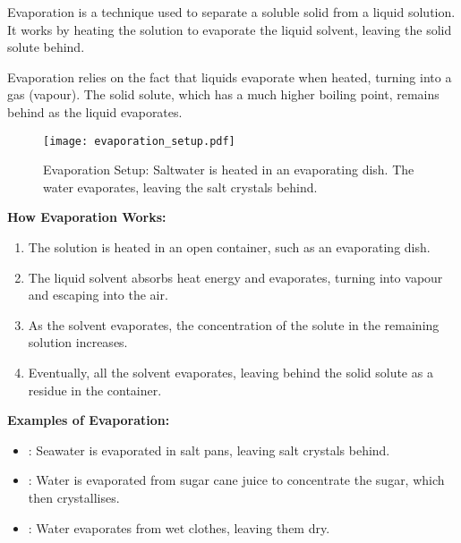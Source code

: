 \begin{keyconcept}{Evaporation}
 is a technique used to separate a soluble solid from a liquid solution. It works by heating the solution to evaporate the liquid solvent, leaving the solid solute behind.
\end{keyconcept}

Evaporation relies on the fact that liquids evaporate when heated, turning into a gas (vapour).  The solid solute, which has a much higher boiling point, remains behind as the liquid evaporates.

\begin{figure}
\centering
\texttt{[image: evaporation\_setup.pdf]}
\caption{Evaporation Setup: Saltwater is heated in an evaporating dish. The water evaporates, leaving the salt crystals behind.}
\end{figure}

\textbf{How Evaporation Works:}
\begin{enumerate}
    \item The solution is heated in an open container, such as an evaporating dish.
    \item The liquid solvent absorbs heat energy and evaporates, turning into vapour and escaping into the air.
    \item As the solvent evaporates, the concentration of the solute in the remaining solution increases.
    \item Eventually, all the solvent evaporates, leaving behind the solid solute as a residue in the container.
\end{enumerate}

\begin{example}
\textbf{Examples of Evaporation:}
\begin{itemize}
    \item {}: Seawater is evaporated in salt pans, leaving salt crystals behind.
    \item {}: Water is evaporated from sugar cane juice to concentrate the sugar, which then crystallises.
    \item {}: Water evaporates from wet clothes, leaving them dry.
\end{itemize}
\end{example}

